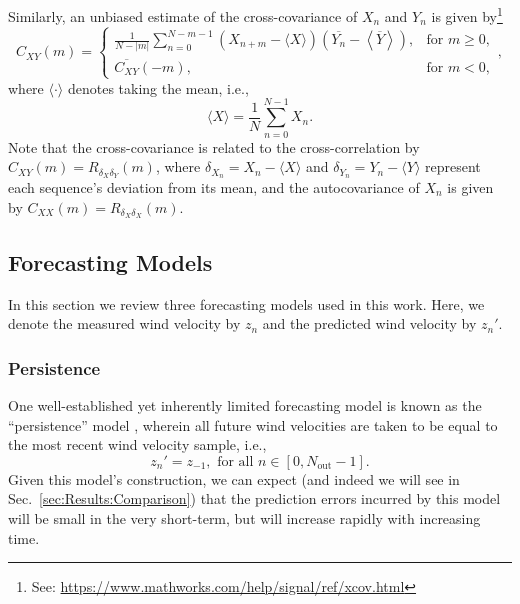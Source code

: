 \documentclass[11pt, oneside]{article}
\newcommand{\secref}[1]{Sec.~\ref{#1}}
\begin{document}
Similarly, an unbiased estimate of the cross-covariance of $X_n$ and $Y_n$ is given by\footnote{See: \url{https://www.mathworks.com/help/signal/ref/xcov.html}}
\begin{equation}\label{eq:xcov}
C_{XY}(m) = 
\begin{cases}
\displaystyle \frac{1}{N - |m|} \sum_{n=0}^{N-m-1} \left( X_{n+m} - \langle X \rangle \right) \left( \overline{Y_n} - \left\langle \overline{Y} \right\rangle \right), & \text{for } m \geq 0,\\[20pt]
\overline{C_{XY}}(-m), & \text{for } m < 0,
\end{cases},
\end{equation}
where $\langle \cdot \rangle$ denotes taking the mean, i.e.,
\begin{equation}
\langle X \rangle = \frac{1}{N} \sum_{n = 0}^{N-1} X_n.
\end{equation}
Note that the cross-covariance is related to the cross-correlation by $C_{XY}(m) = R_{\delta_X \delta_Y}(m)$, where $\delta_{X_n} = X_n - \langle X \rangle$ and $\delta_{Y_n} = Y_n - \langle Y \rangle$ represent each sequence's deviation from its mean, and the autocovariance of $X_n$ is given by $C_{XX}(m) = R_{\delta_X \delta_X}(m)$.

\subsection{Forecasting Models}\label{sec:Models}
In this section we review three forecasting models used in this work.
Here, we denote the measured wind velocity by $z_n$ and the predicted wind velocity by $z_n'$.

\subsubsection{Persistence}
One well-established yet inherently limited forecasting model is known as the ``persistence'' model \citep[Sec.~1.5]{Giebel2011}, wherein all future wind velocities are taken to be equal to the most recent wind velocity sample, i.e.,
\begin{equation}
z_n' = z_{-1}, \text{ for all } n \in [0, N_\text{out} - 1].
\end{equation}
Given this model's construction, we can expect (and indeed we will see in \secref{sec:Results:Comparison}) that the prediction errors incurred by this model will be small in the very short-term, but will increase rapidly with increasing time.
\end{document}
